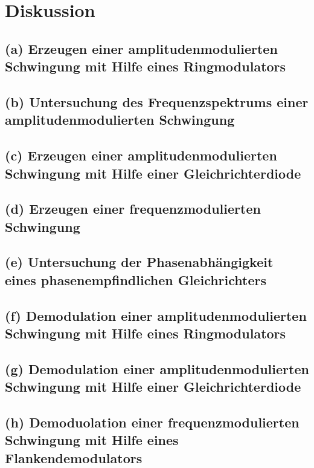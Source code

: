 \section{Diskussion}
\label{sec:Diskussion}


\subsection{(a) Erzeugen einer amplitudenmodulierten Schwingung mit
Hilfe eines Ringmodulators}


\subsection{(b) Untersuchung des Frequenzspektrums einer
amplitudenmodulierten Schwingung}


\subsection{(c) Erzeugen einer amplitudenmodulierten Schwingung
mit Hilfe einer Gleichrichterdiode}


\subsection{(d) Erzeugen einer frequenzmodulierten Schwingung}


\subsection{(e) Untersuchung der Phasenabhängigkeit eines
phasenempfindlichen Gleichrichters}


\subsection{(f) Demodulation einer amplitudenmodulierten Schwingung
mit Hilfe eines Ringmodulators}


\subsection{(g) Demodulation einer amplitudenmodulierten Schwingung
mit Hilfe einer Gleichrichterdiode}


\subsection{(h) Demoduolation einer frequenzmodulierten Schwingung
mit Hilfe eines Flankendemodulators}
